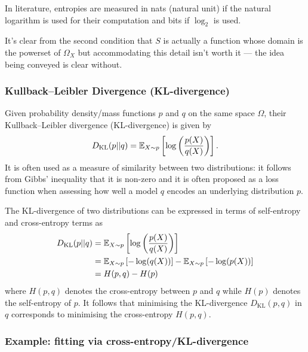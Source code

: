 \documentclass[11pt]{article}
\begin{document}
\begin{appendices}
In literature, entropies are measured in nats (natural unit) if the natural logarithm is used for their computation and bits if $\log_2$ is used.

\begin{tcolorbox}[title={\centering\textbf{Technical note regarding} $\text{dom}(S)$}, colback=myLightBlue, colbacktitle=myDarkBlue, colframe=myDarkBlue, coltitle=white]
    It's clear from the second condition that $S$ is actually a function whose domain is the powerset of $\Omega_X$ but accommodating this detail isn't worth it — the idea being conveyed is clear without.
\end{tcolorbox}

\subsubsection{Kullback–Leibler Divergence (KL-divergence)}

Given probability density/mass functions $p$ and $q$ on the same space $\Omega$, their Kullback–Leibler divergence (KL-divergence) is given by
$$
D_{\text{KL}}(p||q)
=
\mathbb{E}_{X\sim p}\left[\log\left(\frac{p(X)}{q(X)}\right)\right].
$$
It is often used as a measure of similarity between two distributions: it follows from Gibbs' inequality that it is non-zero and it is often proposed as a loss function when assessing how well a model $q$ encodes an underlying distribution $p$.

The KL-divergence of two distributions can be expressed in terms of self-entropy and cross-entropy terms as
\begin{align*}
    D_{\text{KL}}(p||q)
    &=
    \mathbb{E}_{X\sim p}\left[\log\left(\frac{p(X)}{q(X)}\right)\right]\\
    &=
    \mathbb{E}_{X\sim p}\left[-\log(q(X))\right]-\mathbb{E}_{X\sim p}\left[-\log(p(X))\right]\\
    &=
    H(p,q)-H(p)
\end{align*}
where $H(p,q)$ denotes the cross-entropy between $p$ and $q$ while $H(p)$ denotes the self-entropy of $p$. It follows that minimising the KL-divergence $D_{\text{KL}}(p,q)$ in $q$ corresponds to minimising the cross-entropy $H(p,q)$.

\subsubsection*{Example: fitting via cross-entropy/KL-divergence}


\end{appendices}
\end{document}
